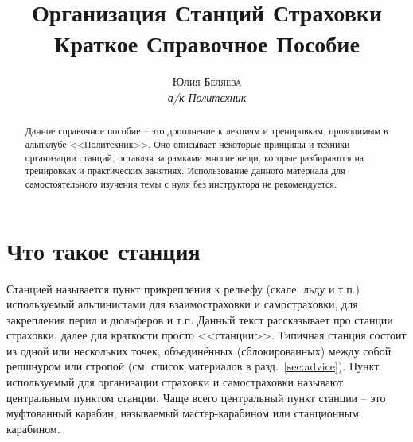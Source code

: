 \documentclass[fleqn, 12pt]{extarticle}
\begin{document}

\title{\textbf{Организация Станций Страховки}\\
\large{Краткое Справочное Пособие}}
\author{\textsc{Юлия Беляева}\\\textit{а/к Политехник}}
\date{\GITAuthorDate}

\maketitle

\begin{abstract}
	Данное справочное пособие -- это дополнение к лекциям и тренировкам, проводимым в альпклубе <<Политехник>>. Оно описывает некоторые принципы и техники организации станций,
	оставляя за рамками многие вещи, которые разбираются на тренировках и практических занятиях. Использование данного материала для самостоятельного изучения темы с нуля без инструктора не
	рекомендуется.
\end{abstract}

\section{Что такое станция}
Станцией называется пункт прикрепления к рельефу (скале, льду и т.п.) используемый альпинистами для взаимостраховки и самостраховки, для
закрепления перил и дюльферов и т.п. Данный текст рассказывает про станции страховки, далее для краткости просто <<станции>>. Типичная станция состоит из одной или нескольких точек,
объединённых (сблокированных) между собой репшнуром или стропой (см. список материалов в разд.~\ref{sec:advice}). Пункт используемый для организации страховки и
самостраховки называют центральным пунктом станции.
Чаще всего центральный пункт станции -- это муфтованный карабин, называемый мастер-карабином или станционным карабином.
\end{document}
